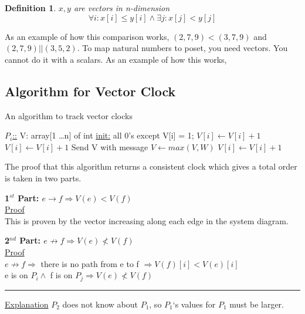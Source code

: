 \documentclass[twoside]{article}
\newcounter{lecnum}
\newcommand{\fig}[3]{
			\vspace{#2 in}
			\begin{center}
			Figure \thelecnum.#1:~#3
			\end{center}
	}
\newtheorem{definition}[theorem]{Definition}
\newenvironment{proof}{{\bf Proof:}}{\hfill\rule{2mm}{2mm}}
\begin{document}
\begin{definition}\label{def:vectorclock}
  $ x, y $ are vectors in n-dimension \\
  \[ \forall i: x[i] \le y[i] \wedge \exists j: x[j] < y[j] \]
\end{definition}
As an example of how this comparison works, $(2, 7, 9) < (3, 7, 9)$ and $(2, 7, 9) || (3, 5, 2)$.
To map natural numbers to poset, you need vectors. You cannot do it with a scalars.
As an example of how this works,


\subsection{Algorithm for Vector Clock}

\begin{algorithm}
\caption{An algorithm to track vector clocks}
\begin{algorithmic}
  \State \underline{$P_i$::} V: array[1 \ldots n] of int
  \State \underline{init:} all 0's except V[i] = 1;
  \State $V[i] \gets V[i] + 1$
  \State $V[i] \gets V[i] + 1$
  \State Send V with message
  \State $V \gets max(V, W)$
  \State $V[i] \gets V[i] + 1$
\end{algorithmic}
\end{algorithm}

\begin{proof}
The proof that this algorithm returns a consistent clock which gives a total order is taken in two parts. \\

\vspace{2mm}

{\bf 1$^{st}$ Part: $e \rightarrow f \Rightarrow V(e) < V(f)$}\\
\underline{Proof}\\
This is proven by the vector increasing along each edge in the system diagram.\\

\vspace{5mm}

{\bf 2$^{nd}$ Part: $e \not\to f \Rightarrow V(e) \not< V(f)$} \\
\underline{Proof} \\
$e \not\to f \Rightarrow $ there is no path from e to f $\Rightarrow V(f)[i] < V(e)[i]$ \\
e is on $P_i \wedge$ f is on $P_j \Rightarrow V(e) \not< V(f)$
\end{proof}
\underline{Explanation} $P_2$ does not know about $P_1$, so $P_1$`s values for $P_1$ must be larger.
\end{document}
